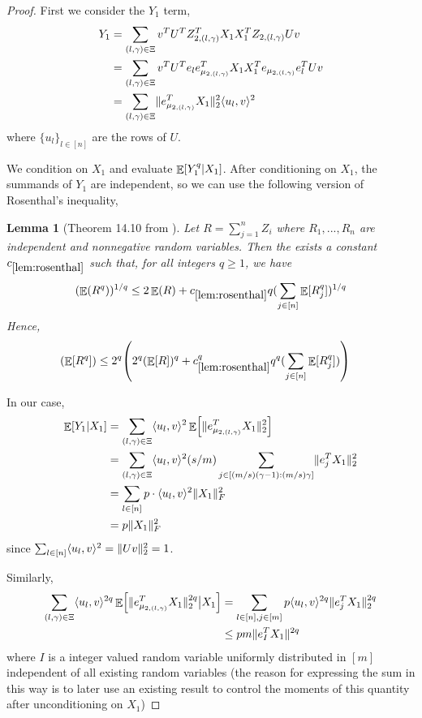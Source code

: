 \documentclass[11pt]{amsart}
\numberwithin{equation}{section}
\numberwithin{equation}{section}
\DeclareMathOperator{\E}{\mathbb{E}}
\DeclarePairedDelimiter{\norm}{\lVert}{\rVert}
\DeclarePairedDelimiter{\ip}{\langle}{\rangle}
\DeclarePairedDelimiter{\paren}{(}{)}
\DeclarePairedDelimiter{\sqbr}{[}{]}
\newtheorem{lemma}[theorem]{Lemma}
\begin{document}
\begin{proof}
First we consider the $Y_1$ term, 
\begin{align*}
    Y_1 &= \sum_{(l,\gamma) \in \Xi} v^TU^T Z^T_{2,(l,\gamma)}X_1 X_1^TZ_{2,(l,\gamma)}Uv \\
    &= \sum_{(l,\gamma) \in \Xi} v^TU^T e_l e_{\mu_{2,(l, \gamma)}}^T X_1 X_1^T e_{\mu_{2,(l, \gamma)}}e_l^TUv \\
    &= \sum_{(l,\gamma) \in \Xi} \norm{e^T_{\mu_{2,(l, \gamma)}}X_1}_2^2 \ip{u_l, v}^2 \\
\end{align*}
where $\{u_l\}_{l \in [n]}$ are the rows of $U$.

We condition on $X_1$ and evaluate $\E \sqbr*{ Y_1^q \vert X_1}$. After conditioning on $X_1$, the summands of $Y_1$ are independent, so we can use the following version of Rosenthal's inequality,

\begin{lemma}[Theorem 14.10 from \cite{boucheron2013concentration}]\label{lem:rosenthal}
Let $R=\sum_{j=1}^nZ_i$ where $R_1,...,R_n$ are independent and nonnegative random variables. Then the exists a constant $c_{\ref{lem:rosenthal}}$ such that, for all integers $q \ge 1$, we have
\begin{align*}
    (\E (R^q))^{1/q} \le 2 \E( R)+ c_{\ref{lem:rosenthal}}q  \paren{\sum_{j \in [n]} \E \sqbr{R_j^q} }^{1/q}
\end{align*}
Hence,
\begin{align*}
    (\E [R^q]) &\le 2^q \paren*{2^q (\E[R])^q+ c_{\ref{lem:rosenthal}}^qq^q  \paren{\sum_{j \in [n]} \E \sqbr{R_j^q} }}
\end{align*}
\end{lemma}

In our case,
\begin{align*}
    \E[Y_1 \vert X_1] &= \sum_{(l,\gamma) \in \Xi} \ip{u_l, v}^2 \E \sqbr*{\norm{e^T_{\mu_{2,(l, \gamma)}}X_1}_2^2}  \\
    &= \sum_{(l,\gamma) \in \Xi} \ip{u_l, v}^2 (s/m)\sum_{j \in [(m/s)(\gamma-1):(m/s)\gamma]} \norm{e^T_{j}X_1}_2^2  \\
    &= \sum_{l \in [n]} p \cdot \ip{u_l, v}^2 \norm{X_1}_F^2 \\
    &= p\norm{X_1}_F^2
\end{align*}
since $\sum_{l \in [n]} \ip{u_l, v}^2 = \norm{Uv}_2^2 = 1$.

Similarly,
\begin{align*}
    \sum_{(l,\gamma) \in \Xi} \ip{u_l, v}^{2q} \E \sqbr*{\norm{e^T_{\mu_{2,(l, \gamma)}}X_1}_2^{2q} \big\vert X_1 } &= \sum_{l \in [n], j \in [m]} p \ip{u_l, v}^{2q} \norm{e^T_{j}X_1}_2^{2q} \\
    &\le pm \norm{e^T_I X_1}^{2q}
\end{align*}
where $I$ is a integer valued random variable uniformly distributed in $[m]$ independent of all existing random variables (the reason for expressing the sum in this way is to later use an existing result to control the moments of this quantity after unconditioning on $X_1$)



\end{proof}
\end{document}
